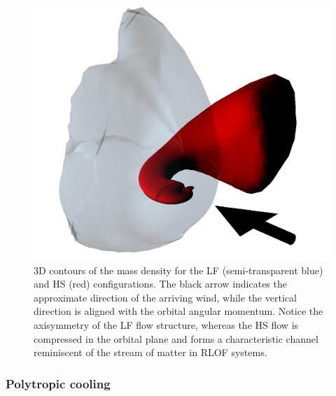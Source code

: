 \documentclass{aa}
\makeatletter
\newcommand*{\rlof}{RLOF\@\xspace}
\makeatother
\begin{document}
\begin{figure}
\centering
\includegraphics[width=0.99\columnwidth]{Pictures/iso-rho_adiab.png}
\caption{3D contours of the mass density for the LF (semi-transparent blue) and HS (red) configurations. The black arrow indicates the approximate direction of the arriving wind, while the vertical direction is aligned with the orbital angular momentum. Notice the axisymmetry of the LF flow structure, whereas the HS flow is compressed in the orbital plane and forms a characteristic channel reminiscent of the stream of matter in \rlof systems.}
\label{fig:3D_adiab}
\end{figure} 

\subsubsection{Polytropic cooling}
\label{sec:cool_T}
\end{document}
